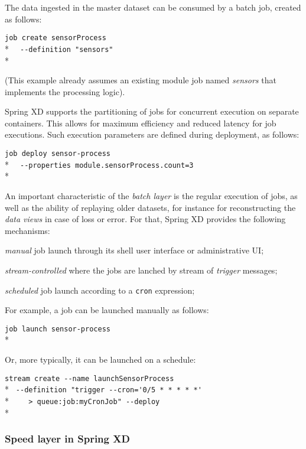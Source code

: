 The data ingested in the master dataset can be consumed by a batch job,
created as follows:

\verb;job create sensorProcess;\\*
\verb;  --definition "sensors";\\*

(This example already assumes an existing module job named \emph{sensors} that
implements the processing logic).

Spring XD supports the partitioning of jobs for concurrent execution on
separate containers. This allows for maximum efficiency and reduced latency
for job executions. Such execution parameters are defined during deployment,
as follows:

\verb;job deploy sensor-process;\\*
\verb;  --properties module.sensorProcess.count=3;\\*

An important characteristic of the \emph{batch layer} is the regular
execution of jobs, as well as the ability of replaying older datasets, for
instance for reconstructing the \emph{data views} in case of loss or error.
For that, Spring XD provides the following mechanisms:

\begin{itemize*}
\item \emph{manual} job launch through its shell user interface or 
administrative UI;
\item \emph{stream-controlled} where the jobs are lanched by stream of 
\emph{trigger} messages;
\item \emph{scheduled} job launch according to a \texttt{cron} expression;
\end{itemize*}

For example, a job can be launched manually as follows:

\verb;job launch sensor-process;\\*

Or, more typically, it can be launched on a schedule:

\verb;stream create --name launchSensorProcess;\\*
\verb; --definition "trigger --cron='0/5 * * * * *';\\* 
\verb;    > queue:job:myCronJob" --deploy;\\*

\subsubsection {Speed layer in Spring XD}

